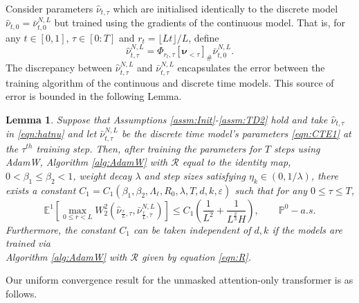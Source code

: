 \documentclass{article}
\newtheorem{lemma}[theorem]{Lemma}
\begin{document}
Consider parameters $\hat \nu_{t,\tau}$ which are initialised identically to the discrete model $\hat \nu_{t,0} =\bar \nu^{N,L}_{t,0}$ but trained using the gradients of the continuous model. That is, for any $t\in[0,1]$, $\tau \in[0:T]$  and $r_t= \lfloor Lt\rfloor /L$, define
\begin{equation}\label{eqn:hatnu}
    \hat \nu^{N,L}_{t,\tau}  = \Phi_{r_t,\tau}[\bm\nu_{<\tau}]_\# \bar \nu^{N,L}_{t,0}.
\end{equation}
The discrepancy between $ \hat \nu^{N,L}_{t,\tau}$ and $\bar \nu^{N,L}_{t,\tau}$ encapsulates the error between the training algorithm of the continuous and discrete time models. This source of error is bounded in the following Lemma.
\begin{lemma}\label{lemma:ParamDiv}
    Suppose that Assumptions \ref{assm:Init}-\ref{assm:TD2} hold and take $\hat\nu_{t,\tau}$ in \eqref{eqn:hatnu} and let $\bar\nu^{N,L}_{t,\tau}$ be the discrete time model's parameters \eqref{eqn:CTE1} at the $\tau^{th}$ training step. Then, after training the parameters for $T$ steps using AdamW, Algorithm \ref{alg:AdamW} with $\mathcal R$ equal to the identity map, $0<\beta_1 \le \beta_2<1$, weight decay $\lambda$ and step sizes satisfying $\eta_k\in(0,1/\lambda)$, there exists a constant $C_1=C_1(\beta_1,\beta_2,\Lambda_{\ell},R_0,\lambda,T, d,k,\varepsilon)$ such that for any $0\le \tau \le T$, 
    \begin{equation*}
        \mathbb E^1\left[\max_{0\le r < L}  W_2^2(\hat\nu_{\frac{r}{L},\tau},\bar \nu^{N,L}_{\frac{r}{L},\tau})\right]\le C_1\left(\frac{1}{L^{2}}+\frac{1}{ L^{\frac{2}{3}}H}\right), \qquad \mathbb P^0-a.s.
        \end{equation*}
 Furthermore, the constant $C_1$ can be taken independent of $d,k$ if the models are trained via \\Algorithm \ref{alg:AdamW} with $\mathcal R$ given by equation \eqref{eqn:R}.
\end{lemma}
Our uniform convergence result for the unmasked attention-only transformer is as follows.\\ 
\end{document}
